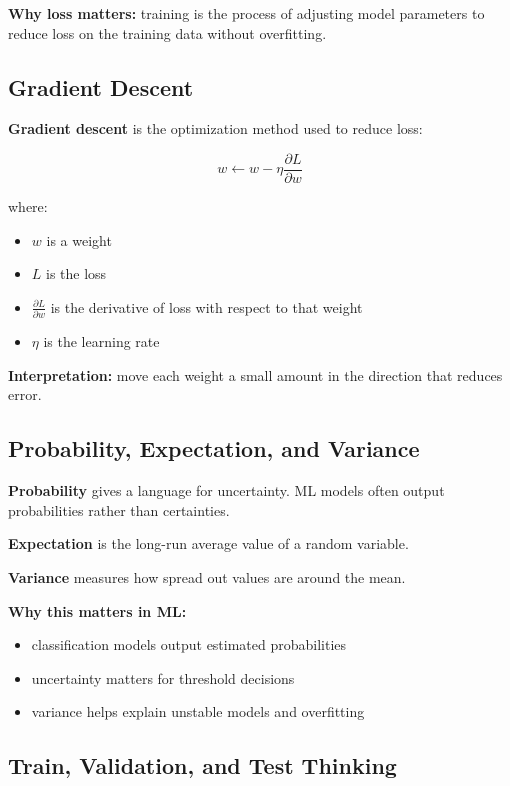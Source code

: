 \documentclass[12pt, a4paper, oneside]{book}
\begin{document}
\textbf{Why loss matters:} training is the process of adjusting model parameters to reduce loss on the training data without overfitting.

\subsection{Gradient Descent}

\textbf{Gradient descent} is the optimization method used to reduce loss:

\[
w \leftarrow w - \eta \frac{\partial L}{\partial w}
\]

where:
\begin{itemize}[leftmargin=2em]
    \item $w$ is a weight
    \item $L$ is the loss
    \item $\frac{\partial L}{\partial w}$ is the derivative of loss with respect to that weight
    \item $\eta$ is the learning rate
\end{itemize}

\textbf{Interpretation:} move each weight a small amount in the direction that reduces error.

\subsection{Probability, Expectation, and Variance}

\textbf{Probability} gives a language for uncertainty. ML models often output probabilities rather than certainties.

\textbf{Expectation} is the long-run average value of a random variable.

\textbf{Variance} measures how spread out values are around the mean.

\textbf{Why this matters in ML:}
\begin{itemize}[leftmargin=2em]
    \item classification models output estimated probabilities
    \item uncertainty matters for threshold decisions
    \item variance helps explain unstable models and overfitting
\end{itemize}

\subsection{Train, Validation, and Test Thinking}
\end{document}
